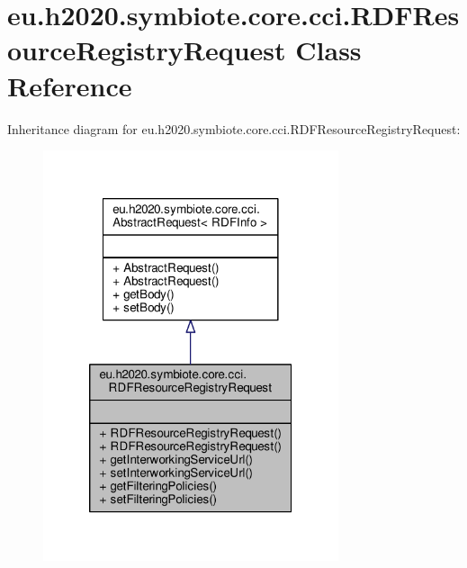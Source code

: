 \hypertarget{classeu_1_1h2020_1_1symbiote_1_1core_1_1cci_1_1RDFResourceRegistryRequest}{}\section{eu.\+h2020.\+symbiote.\+core.\+cci.\+R\+D\+F\+Resource\+Registry\+Request Class Reference}
\label{classeu_1_1h2020_1_1symbiote_1_1core_1_1cci_1_1RDFResourceRegistryRequest}


Inheritance diagram for eu.\+h2020.\+symbiote.\+core.\+cci.\+R\+D\+F\+Resource\+Registry\+Request\+:
\nopagebreak
\begin{figure}[H]
\begin{center}
\leavevmode
\includegraphics[width=246pt]{classeu_1_1h2020_1_1symbiote_1_1core_1_1cci_1_1RDFResourceRegistryRequest__inherit__graph}
\end{center}
\end{figure}


